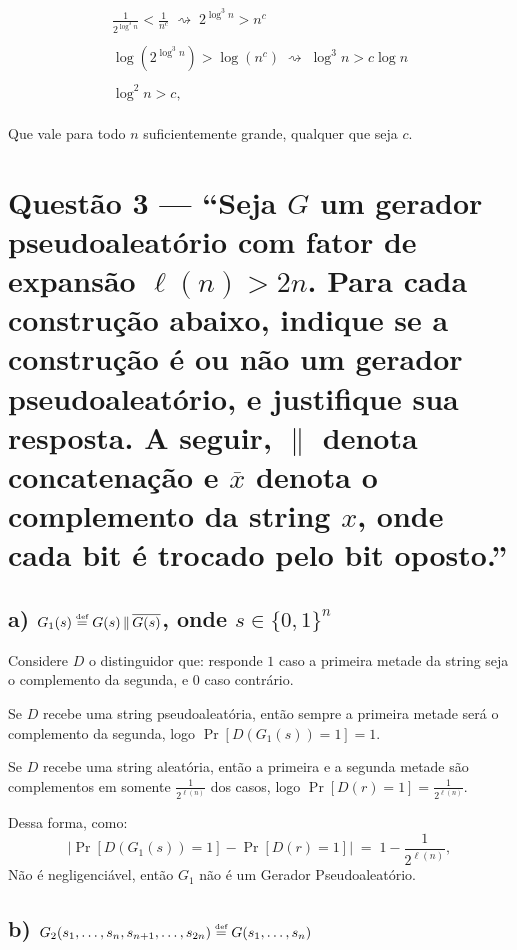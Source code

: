 \documentclass[11pt,a4paper]{article}
\newcommand{\defeq}{\stackrel{\text{\tiny def}}{=}}
\begin{document}
\begin{gather*}
    \frac{1}{2^{\log^{3} n}} < \frac{1}{n^{c}} \;\rightsquigarrow\; 2^{\log^{3} n} > n^{c} \\ \\
    \log\!\left(2^{\log^{3} n}\right) > \log\!\left(n^{c}\right) \;\rightsquigarrow\; \log^{3} n > c \log n \\ \\
    \log^{2} n > c,\\
\end{gather*}

Que vale para todo $n$ suficientemente grande, qualquer que seja $c$.

\clearpage

\section*{Questão 3 --- ``Seja $G$ um gerador pseudoaleatório com fator de
expansão $\ell(n) > 2n$. Para cada construção abaixo, indique se a construção é
ou não um gerador pseudoaleatório, e justifique sua resposta. A seguir, $\|$
    denota concatenação e $\overline{x}$ denota o complemento da string $x$, onde
    cada bit é trocado pelo bit oposto.''}

\subsection*{a) $G_1(s) \defeq G(s) \,\|\, \overline{G(s)}$, onde
    $s \in \{0,1\}^{n}$}

Considere $D$ o distinguidor que: responde $1$ caso a primeira metade da string seja o complemento da segunda, e
$0$ caso contrário.

Se $D$ recebe uma string pseudoaleatória, então sempre a primeira metade será o
complemento da segunda, logo $\Pr[D(G_1(s)) = 1] = 1$.

Se $D$ recebe uma string aleatória, então a primeira e a segunda metade são
complementos em somente $\frac{1}{2^{\ell(n)}}$ dos casos, logo
$\Pr[D(r) = 1] = \frac{1}{2^{\ell(n)}}$.

Dessa forma, como:
\[
    \bigl|\Pr[D(G_1(s)) = 1] - \Pr[D(r) = 1]\bigr|
    \;=\; 1 - \frac{1}{2^{\ell(n)}},
\]
Não é negligenciável, então $G_1$ não é um Gerador Pseudoaleatório.

\subsection*{b) $G_2(s_1,\ldots,s_n,s_{n+1},\ldots,s_{2n})
\defeq G(s_1,\ldots,s_n)$}
\end{document}
